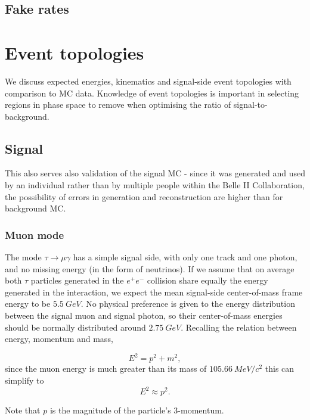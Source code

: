 \documentclass[12pt]{thesis}  %
\begin{document}
\section{Fake rates}


\pagebreak


\chapter{Event topologies}

We discuss expected energies, kinematics and signal-side event topologies with comparison to MC data. Knowledge of event topologies is important in selecting regions in phase space to remove when optimising the ratio of signal-to-background. 

\section{Signal}

This also serves also validation of the signal MC - since it was generated and used by an individual rather than by multiple people within the Belle II Collaboration, the possibility of errors in generation and reconstruction are higher than for background MC. 


\subsection{Muon mode}

The mode $\tau\to\mu\gamma$ has a simple signal side, with only one track and one photon, and no missing energy (in the form of neutrinos). If we assume that on average both $\tau$ particles generated in the $e^+ e^-$ collision share equally the energy generated in the interaction, we expect the mean signal-side center-of-mass frame energy to be $\SI{5.5}{GeV}$. No physical preference is given to the energy distribution between the signal muon and signal photon, so their center-of-mass energies should be normally distributed around $\SI{2.75}{GeV}$. Recalling the relation between energy, momentum and mass,

\begin{equation}
E^2 = p^2 + m^2,
\end{equation}
since the muon energy is much greater than its mass of $\SI{105.66}{MeV/c^2}$ this can simplify to
\begin{equation}
E^2 \approx p^2.
\end{equation}

Note that $p$ is the magnitude of the particle's 3-momentum.
\end{document}
